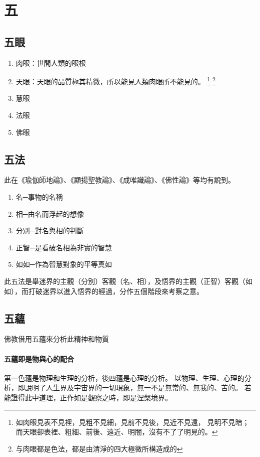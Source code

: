 \section{五}

\subsection{五眼}
\begin{enumerate}
  \item 肉眼：世間人類的眼根
  \item 天眼：天眼的品質極其精微，所以能見人類肉眼所不能見的。
    \footnote{如肉眼見表不見裡，見粗不見細，見前不見後，見近不見遠， 見明不見暗；而天眼卻表裡、粗細、前後、遠近、明闇，沒有不了了明見的。}
    \footnote{与肉眼都是色法，都是由清淨的四大極微所構造成的}
  \item 慧眼
  \item 法眼
  \item 佛眼
\end{enumerate}

\subsection{五法}
此在《瑜伽師地論》、《顯揚聖教論》、《成唯識論》、《佛性論》等均有說到。
\begin{enumerate}
  \item 名─事物的名稱
  \item 相─由名而浮起的想像
  \item 分別─對名與相的判斷
  \item 正智─是看破名相為非實的智慧
  \item 如如─作為智慧對象的平等真如
\end{enumerate}
此五法是舉迷界的主觀（分別）客觀（名、相），及悟界的主觀（正智）客觀（如如），而打破迷界以進入悟界的經過，分作五個階段來考察之意。



\subsection{五蘊}
佛教借用五蘊來分析此精神和物質
\paragraph{五蘊即是物與心的配合}
第一色蘊是物理和生理的分析，後四蘊是心理的分析。
以物理、生理、心理的分析，即說明了人生界及宇宙界的一切現象，無一不是無常的、無我的、苦的。
若能證得此中道理，正作如是觀察之時，即是涅槃境界。
